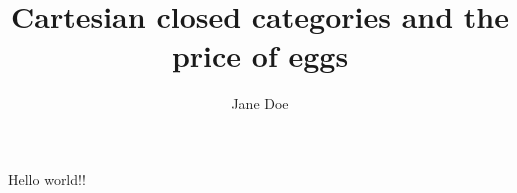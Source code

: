 \documentclass{article}
\title{Cartesian closed categories and the price of eggs}
\author{Jane Doe}
\begin{document}
   
   \pym\simple[\test,arg2=\test]
   
	Hello world!!\ \
\end{document}
